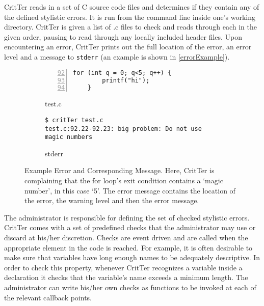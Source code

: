 \documentclass[12pt]{report}
\newcommand{\programName}{CritTer\xspace}
\begin{document}
\programName reads in a set of C source code files and determines if they contain any of the 
defined stylistic errors. It is run from the command line inside one's working directory. \programName is 
given a list of .c files to check and reads through each in the given order, pausing to read through any 
locally included header files. Upon encountering an error, \programName prints out the full location of 
the error, an error level and a message to \lstinline{stderr} (an example is shown in 
\autoref{errorExample}). 

\begin{figure}
\begin{subfigure}[b]{.49\linewidth}
\caption{test.c}
\label{errorExampleCode}
\begin{lstlisting}[numbers=left, firstnumber=92, xleftmargin=.8cm]
	for (int q = 0; q<5; q++) {
		printf("hi");
	}
\end{lstlisting}
\end{subfigure}
\begin{subfigure}[b]{.49\linewidth}
\caption{stderr}
\label{errorExampleStderr}
\begin{lstlisting}[xleftmargin=.7cm]
$ critTer test.c
test.c:92.22-92.23: big problem: Do not use magic numbers
\end{lstlisting}
\end{subfigure}
\caption[Example Error and Corresponding Message]{Example Error and Corresponding Message. Here, \programName is complaining that the for loop's exit condition contains a `magic number', in this case `5'. The error message contains the location of the error, the warning level and then the error message.}
\label{errorExample}
\end{figure}

The administrator is responsible for defining the set of checked stylistic errors. \programName 
comes with a set of predefined checks that the administrator may use or discard at his\slash her 
discretion. Checks are event driven and are called when the appropriate element in the code is reached. 
For example, it is often desirable to make sure that variables have long enough names to be adequately 
descriptive. In order to check this property, whenever \programName recognizes a variable inside a 
declaration it checks that the variable's name exceeds a minimum length. The administrator can write 
his\slash her own checks as functions to be invoked at each of the relevant callback points.
\end{document}

